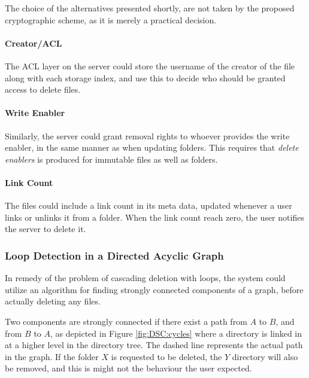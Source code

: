 \documentclass[pdftex,english,10pt,b5paper,twoside]{book}
\begin{document}
The choice of the alternatives presented shortly, are not taken by the proposed
cryptographic scheme, as it is merely a practical decision.

\paragraph{Creator/\ac{ACL}} The \ac{ACL} layer on the server could store the
username of the creator of the file along with each storage index, and use this
to decide who should be granted access to delete files.

\paragraph{Write Enabler} Similarly, the server could grant removal rights to
whoever provides the write enabler, in the same manner as when updating
folders. This requires that \emph{delete enablers} is produced for immutable
files as well as folders.

\paragraph{Link Count} The files could include a link count in its meta data,
updated whenever a user links or unlinks it from a folder. When the link count
reach zero, the user notifies the server to delete it.

\subsubsection{Loop Detection in a Directed Acyclic Graph}

In remedy of the problem of cascading deletion with loops, the system could
utilize an algorithm for finding strongly connected components of a graph,
before actually deleting any files.

Two components are strongly connected if there exist a path from $A$ to $B$,
and from $B$ to $A$, as depicted in Figure \ref{fig:DSC:cycles} where a
directory is linked in at a higher level in the directory tree. The dashed line
represents the actual path in the graph. If the folder $X$ is requested to be
deleted, the $Y$ directory will also be removed, and this is might not the
behaviour the user expected.
\end{document}
